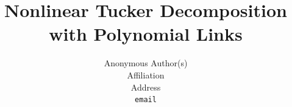 \documentclass{article}
\title{Nonlinear Tucker Decomposition with Polynomial Links}
\author{%
  Anonymous Author(s)\\
  Affiliation\\
  Address\\
  \texttt{email}
}
\begin{document}
\maketitle








\FloatBarrier

\FloatBarrier



\FloatBarrier



\appendix



\FloatBarrier

\end{document}
